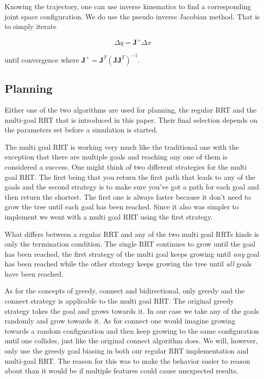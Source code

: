 \documentclass[letterpaper, 10 pt, conference]{ieeeconf}  %
\begin{document}
Knowing the trajectory, one can use inverse kinematics to find a corresponding
joint space configuration. We do use the pseudo inverse Jacobian method.
That is to simply iterate

\[
  \Delta q = \mathbf{J}^{+} \Delta x
\]

until convergence where $\mathbf{J}^{+} =
\mathbf{J}^T(\mathbf{J}\mathbf{J}^T)^{-1}$.


\subsection{Planning}

Either one of the two algorithms are used for planning, the regular RRT
\cite{lavalle2001randomized} and the multi-goal RRT that is introduced in this
paper. Their final selection depends on the parameters set before a simulation is started.

The multi goal RRT is working very much like the traditional one with
the exception that there are multiple goals and reaching any one of them
is considered a success. One might think of two different strategies for
the multi goal RRT. The first being that you return the first path that
leads to any of the goals and the second strategy is to make sure you've
got a path for each goal and then return the shortest. The first one is
always faster because it don't need to grow the tree until each goal has
been reached. Since it also was simpler to implement we went with a
multi goal RRT using the first strategy.

What differs between a regular RRT and any of the two multi goal RRTs
kinds is only the termination condition. The single RRT continues to
grow until the goal has been reached, the first strategy of the multi
goal keeps growing until \emph{any} goal has been reached while the
other strategy keeps growing the tree until \emph{all} goals have been
reached.

As for the concepts of greedy, connect and bidirectional, only greedy and the
connect strategy is applicable to the multi goal RRT. The original greedy
strategy takes the goal and grows towards it\cite{robocup, FergusonKS06}. In
our case we take any of the goals randomly and grow towards it. As for connect
one would imagine growing towards a random configuration and then keep growing
to the same configuration until one collides, just like the original connect
algorithm does\cite{kuffner2000rrt}. We will, however, only use the greedy goal
biasing in both our regular RRT implementation and multi-goal RRT. The reason
for this was to make the behavior easier to reason about than it would be if
multiple features could cause unexpected results.
\end{document}
